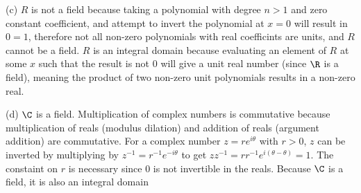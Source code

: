 \documentclass{article}
\begin{document}
(c) $R$ is not a field because taking a polynomial with degree $n > 1$ and zero constant coefficient, and attempt to invert the polynomial at $x = 0$ will result in $0 = 1$, therefore not all non-zero polynomials with real coefficints are units, and $R$ cannot be a field. $R$ is an integral domain because evaluating an element of $R$ at some $x$ such that the result is not 0 will give a unit real number (since $\R$ is a field), meaning the product of two non-zero unit polynomials results in a non-zero real.

(d) $\C$ is a field. Multiplication of complex numbers is commutative because multiplication of reals (modulus dilation) and addition of reals (argument addition) are commutative. For a complex number $z = re^{i\theta}$ with $r > 0$, $z$ can be inverted by multiplying by $z^{-1} = r^{-1}e^{-i\theta}$ to get $zz^{-1} = rr^{-1}e^{i(\theta - \theta)} = 1$. The constaint on $r$ is necessary since 0 is not invertible in the reals. Because $\C$ is a field, it is also an integral domain
\end{document}
